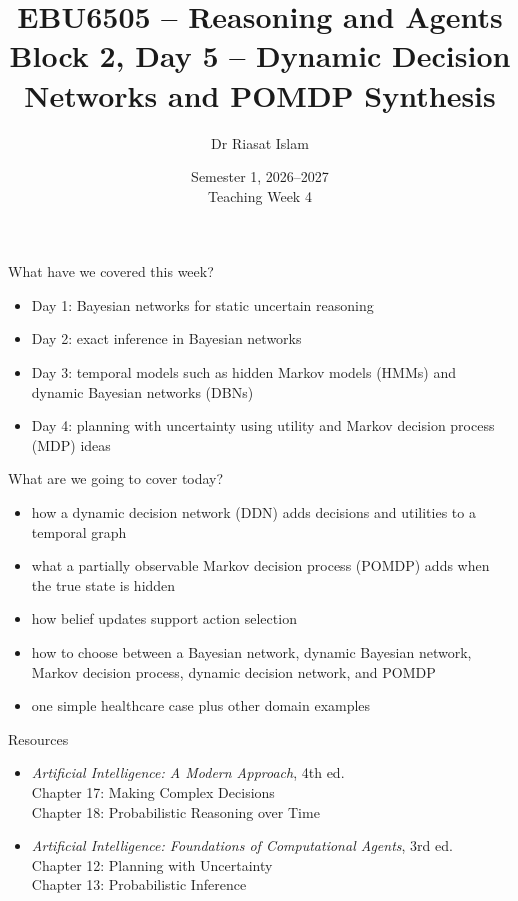 \documentclass[aspectratio=169]{beamer}
\title[EBU6505 B2 D5]{EBU6505 -- Reasoning and Agents\\Block 2, Day 5 -- Dynamic Decision Networks and POMDP Synthesis}
\author{Dr Riasat Islam}
\institute{Queen Mary University of London}
\date[Teaching Week 4]{Semester 1, 2026--2027 \\ Teaching Week 4}
\newcommand{\defaultdeckrefs}{AIMA4e Ch.17--18; Poole3e Ch.12--14}
\newcommand{\currentsliderefs}{\defaultdeckrefs}
\newcommand{\setslideref}[1]{\gdef\currentsliderefs{#1}}
\begin{document}
\setslideref{AIMA4e Ch.17--18; Poole3e Ch.12--14}
\begin{frame}
  \titlepage
\end{frame}

\begin{frame}{What have we covered this week?}
\begin{itemize}
  \item Day 1: Bayesian networks for static uncertain reasoning
  \item Day 2: exact inference in Bayesian networks
  \item Day 3: temporal models such as hidden Markov models (HMMs) and dynamic Bayesian networks (DBNs)
  \item Day 4: planning with uncertainty using utility and Markov decision process (MDP) ideas
\end{itemize}
\end{frame}

\begin{frame}{What are we going to cover today?}
\begin{itemize}
  \item how a dynamic decision network (DDN) adds decisions and utilities to a temporal graph
  \item what a partially observable Markov decision process (POMDP) adds when the true state is hidden
  \item how belief updates support action selection
  \item how to choose between a Bayesian network, dynamic Bayesian network, Markov decision process, dynamic decision network, and POMDP
  \item one simple healthcare case plus other domain examples
\end{itemize}
\end{frame}

\begin{frame}{Resources}
\begin{itemize}
  \item \textit{Artificial Intelligence: A Modern Approach}, 4th ed.\\
  Chapter 17: Making Complex Decisions\\
  Chapter 18: Probabilistic Reasoning over Time
  \item \textit{Artificial Intelligence: Foundations of Computational Agents}, 3rd ed.\\
  Chapter 12: Planning with Uncertainty\\
  Chapter 13: Probabilistic Inference
\end{itemize}
\end{frame}
\end{document}
